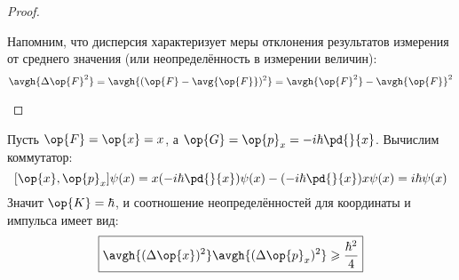 \begin{proof}
\begin{enumerate}
Напомним, что дисперсия характеризует меры отклонения результатов измерения от среднего значения (или неопределённость в измерении величин):
$$
  \avgh{\Delta\op{F}^2} = \avgh{(\op{F}-\avg{\op{F}})^2} =
    \avgh{\op{F}^2}-\avgh{\op{F}}^2
$$
\end{enumerate}
\end{proof}

\begin{exmpl*} Пусть $\op{F}=\op{x}=x$, а $\op{G}=\op{p}_x=-i\hbar\pd{}{x}$. Вычислим коммутатор:
$$
  [\op{x}, \op{p}_x] \psi(x) =
    x (-i\hbar\pd{}{x})\psi(x) - (-i\hbar\pd{}{x}) x \psi(x) =
    i\hbar\psi(x)
$$%
%
Значит $\op{K}=\hbar$, и соотношение неопределённостей для координаты и импульса имеет вид:
$$
  \boxed{\avgh{(\Delta\op{x})^2}\avgh{(\Delta\op{p}_x)^2} \geqslant \frac{\hbar^2}{4}}
$$
\end{exmpl*}

